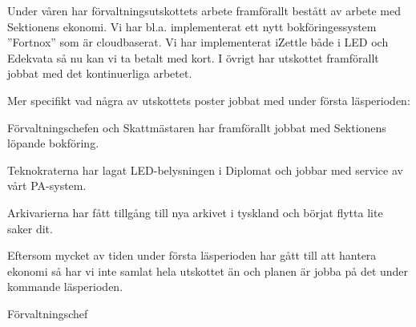 \documentclass[../_main/handlingar.tex]{subfiles}
\begin{document}

Under våren har förvaltningsutskottets arbete framförallt bestått av arbete med Sektionens ekonomi. Vi har bl.a. implementerat ett nytt bokföringessystem ”Fortnox” som är cloudbaserat. Vi har implementerat iZettle både i LED och Edekvata så nu kan vi ta betalt med kort. I övrigt har utskottet framförallt jobbat med det kontinuerliga arbetet.

Mer specifikt vad några av utskottets poster jobbat med under första läsperioden:
\begin{dashlist}
\item Förvaltningschefen och Skattmästaren har framförallt jobbat med Sektionens löpande bokföring.
\item Teknokraterna har lagat LED-belysningen i Diplomat och jobbar med service av vårt PA-system.
\item Arkivarierna har fått tillgång till nya arkivet i tyskland och börjat flytta lite saker dit.
\end{dashlist}

Eftersom mycket av tiden under första läsperioden har gått till att hantera ekonomi så har vi inte samlat hela utskottet än och planen är jobba på det under kommande läsperioden.


\begin{signatures}{1}
    \mvh
    \signature{Anders Nilsson}{Förvaltningschef}
\end{signatures}
\end{document}
